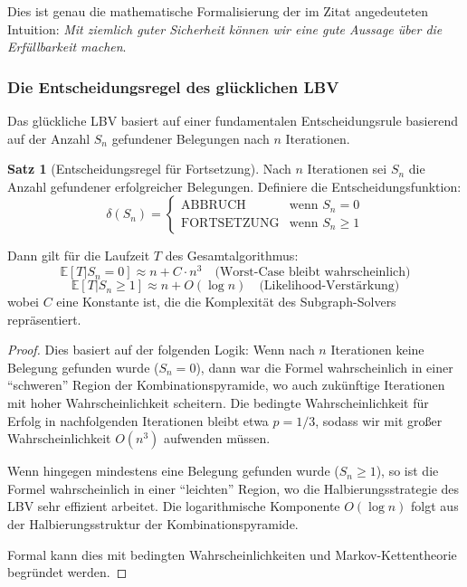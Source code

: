 ﻿\documentclass[a4paper,12pt]{article}
\theoremstyle{definition}
\newtheorem{satz}{Satz}
\begin{document}
Dies ist genau die mathematische Formalisierung der im Zitat angedeuteten Intuition: \emph{Mit ziemlich guter Sicherheit können wir eine gute Aussage über die Erfüllbarkeit machen}.

\subsubsection{Die Entscheidungsregel des glücklichen LBV}

Das glückliche LBV basiert auf einer fundamentalen Entscheidungsrule basierend auf der Anzahl $S_n$ gefundener Belegungen nach $n$ Iterationen.

\begin{satz}[Entscheidungsregel für Fortsetzung]
Nach $n$ Iterationen sei $S_n$ die Anzahl gefundener erfolgreicher Belegungen. Definiere die Entscheidungsfunktion:
\[
\delta(S_n) = \begin{cases}
\text{ABBRUCH} & \text{wenn } S_n = 0 \\
\text{FORTSETZUNG} & \text{wenn } S_n \geq 1
\end{cases}
\]

Dann gilt für die Laufzeit $T$ des Gesamtalgorithmus:
\[
\mathbb{E}[T | S_n = 0] \approx n + C \cdot n^3 \quad \text{(Worst-Case bleibt wahrscheinlich)}
\]
\[
\mathbb{E}[T | S_n \geq 1] \approx n + O(\log n) \quad \text{(Likelihood-Verstärkung)}
\]
wobei $C$ eine Konstante ist, die die Komplexität des Subgraph-Solvers repräsentiert.
\end{satz}

\begin{proof}
Dies basiert auf der folgenden Logik: Wenn nach $n$ Iterationen keine Belegung gefunden wurde ($S_n = 0$), dann war die Formel wahrscheinlich in einer ``schweren'' Region der Kombinationspyramide, wo auch zukünftige Iterationen mit hoher Wahrscheinlichkeit scheitern. Die bedingte Wahrscheinlichkeit für Erfolg in nachfolgenden Iterationen bleibt etwa $p = 1/3$, sodass wir mit großer Wahrscheinlichkeit $O(n^3)$ aufwenden müssen.

Wenn hingegen mindestens eine Belegung gefunden wurde ($S_n \geq 1$), so ist die Formel wahrscheinlich in einer ``leichten'' Region, wo die Halbierungsstrategie des LBV sehr effizient arbeitet. Die logarithmische Komponente $O(\log n)$ folgt aus der Halbierungsstruktur der Kombinationspyramide.

Formal kann dies mit bedingten Wahrscheinlichkeiten und Markov-Kettentheorie begründet werden.
\end{proof}
\end{document}
